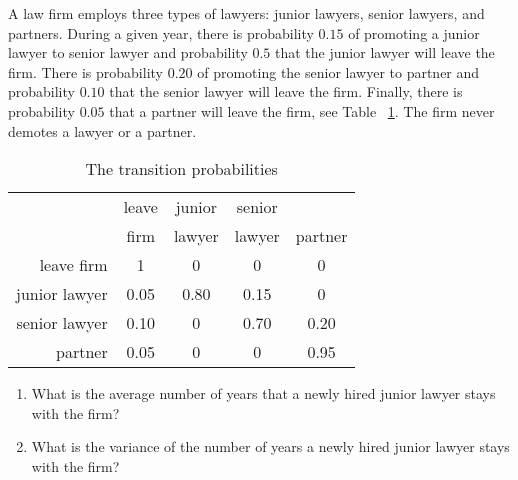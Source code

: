 \documentclass[12pt]{article}
\begin{document}
\begin{exercise}
    A law firm employs three types of lawyers:  junior lawyers, senior
    lawyers, and partners.  During a given year, there is probability \(
    0.15 \) of promoting a junior lawyer to senior lawyer and
    probability \( 0.5 \) that the junior lawyer will leave the firm.
    There is probability \( 0.20 \) of promoting the senior lawyer to
    partner and probability \( 0.10 \) that the senior lawyer will leave
    the firm.  Finally, there is probability \( 0.05 \) that a partner
    will leave the firm, see Table~%
    \ref{tab:newwaitingtimeabsorption:lawyers}.  The firm never demotes
    a lawyer or a partner.

    \begin{table}[htbp]
        \caption[]{The transition probabilities }
        \vspace{4mm}
        \begin{tabular}[tb]
            {r|cccc}    & leave & junior        & senior        & \\
                & firm  & lawyer        & lawyer        & partner \\
            \hline
            leave firm  & 1     & 0     & 0     & 0 \\
            junior lawyer       & 0.05  & 0.80  & 0.15  & 0 \\
            senior lawyer       & 0.10  & 0     & 0.70  & 0.20 \\
            partner     & 0.05  & 0     & 0     & 0.95
        \end{tabular}
        \label{tab:newwaitingtimeabsorption:lawyers}
    \end{table}

    \begin{enumerate}
        \item
            What is the average number of years that a newly hired
            junior lawyer stays with the firm?
        \item
            What is the variance of the number of years a newly hired
            junior lawyer stays with the firm?
    \end{enumerate}
\end{exercise}
\end{document}
